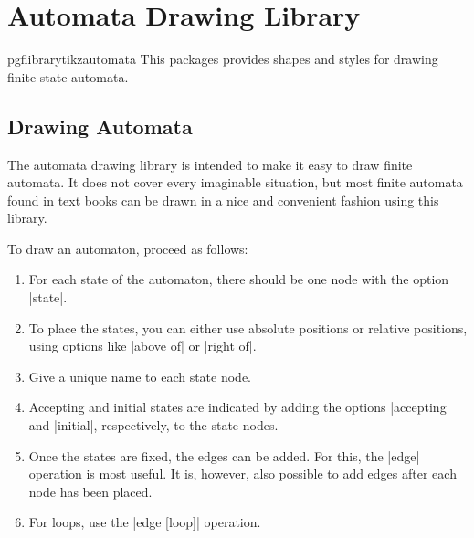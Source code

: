 %




\section{Automata Drawing Library}

\begin{package}{pgflibrarytikzautomata}
  This packages provides shapes and styles for drawing finite state
  automata. 
\end{package}


\subsection{Drawing Automata}

The automata drawing library is intended to make it easy to draw
finite automata. It does not cover every imaginable situation, but
most finite automata found in text books can be drawn in a nice and
convenient fashion using this library.

To draw an automaton, proceed as follows:
\begin{enumerate}
\item For each state of the automaton, there should be one node with
  the option |state|.
\item To place the states, you can either use absolute positions or
  relative positions, using options like |above of| or |right of|.
\item Give a unique name to each state node.
\item Accepting and initial states are indicated by adding the
  options |accepting| and |initial|, respectively, to the state
  nodes.
\item Once the states are fixed, the edges can be added. For this, the
  |edge| operation is most useful. It is, however, also possible to
  add edges after each node has been placed.
\item For loops, use the |edge [loop]| operation.
\end{enumerate}


